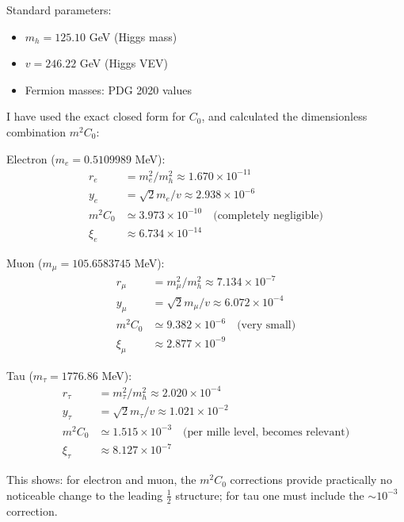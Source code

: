 	\begin{numerical}
		Standard parameters:
		\begin{itemize}
			\item $m_h = 125.10$ GeV (Higgs mass)
			\item $v = 246.22$ GeV (Higgs VEV)
			\item Fermion masses: PDG 2020 values
		\end{itemize}
		
		I have used the exact closed form for $C_0$, and calculated the dimensionless combination $m^2C_0$:
		
		Electron ($m_e = 0.5109989$ MeV):
		\begin{align}
			r_e &= m_e^2/m_h^2 \approx 1.670 \times 10^{-11}\\
			y_e &= \sqrt{2} m_e/v \approx 2.938 \times 10^{-6}\\
			m^2C_0 &\simeq 3.973 \times 10^{-10} \quad \text{(completely negligible)}\\
			\xi_e &\approx 6.734 \times 10^{-14}
		\end{align}
		
		Muon ($m_\mu = 105.6583745$ MeV):
		\begin{align}
			r_\mu &= m_\mu^2/m_h^2 \approx 7.134 \times 10^{-7}\\
			y_\mu &= \sqrt{2} m_\mu/v \approx 6.072 \times 10^{-4}\\
			m^2C_0 &\simeq 9.382 \times 10^{-6} \quad \text{(very small)}\\
			\xi_\mu &\approx 2.877 \times 10^{-9}
		\end{align}
		
		Tau ($m_\tau = 1776.86$ MeV):
		\begin{align}
			r_\tau &= m_\tau^2/m_h^2 \approx 2.020 \times 10^{-4}\\
			y_\tau &= \sqrt{2} m_\tau/v \approx 1.021 \times 10^{-2}\\
			m^2C_0 &\simeq 1.515 \times 10^{-3} \quad \text{(per mille level, becomes relevant)}\\
			\xi_\tau &\approx 8.127 \times 10^{-7}
		\end{align}
		
		This shows: for electron and muon, the $m^2C_0$ corrections provide practically no noticeable change to the leading $\frac{1}{2}$ structure; for tau one must include the $\sim 10^{-3}$ correction.
	\end{numerical}
	

